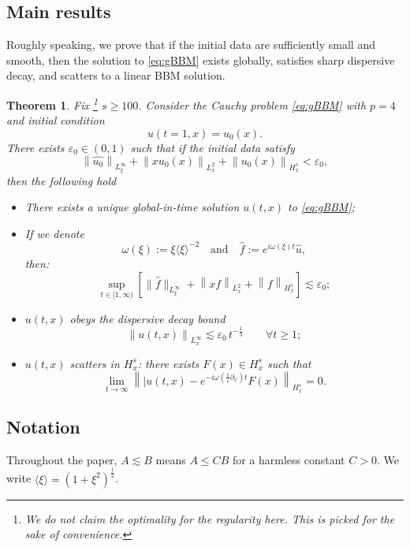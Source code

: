\documentclass[reqno,english,11pt]{amsart}
\newcommand{\eps}{\varepsilon}
\newcommand{\snorm}[1]{\left\|#1\right\|}
\newtheorem{theorem}{Theorem}[section]
\theoremstyle{definition}
\numberwithin{equation}{section}
\begin{document}
\subsection{Main results}
Roughly speaking, we prove that if the initial data are sufficiently small and smooth, then the solution to \eqref{eq:gBBM} exists globally, satisfies sharp dispersive decay, and scatters to a linear BBM solution.
\begin{theorem}\label{thm:main}
Fix \footnote{We do not claim the optimality for the regularity here. This is picked for the sake of convenience.} $s \ge 100$. Consider the Cauchy problem \eqref{eq:gBBM} with $p = 4$ and initial condition 
\begin{equation}
u(t=1,x) = u_0(x).
\end{equation}
There exists $\eps_0 \in (0,1)$ such that if the initial data satisfy
$$\snorm{\widehat{u_0}}_{L^\infty_\xi}+\snorm{xu_0(x)}_{L^2_x}+\snorm{u_0(x)}_{H^s_x}<\eps_0,$$
then the following hold
\begin{itemize}
\item There exists a unique global-in-time solution $u(t,x)$ to \eqref{eq:gBBM};

\item If we denote
$$\omega(\xi) := \xi \langle \xi \rangle^{-2}\quad \text{and} \quad\widehat{f} := e^{i\omega(\xi)t}\widehat{u},$$
then:%
$$\sup_{t \in [1,\infty)}\left[\|\widehat{f}\|_{L^\infty_\xi}+ \snorm{x f}_{L^2_x}+ \snorm{f}_{H^s_x}\right]\lesssim \eps_0;$$

\item $u(t,x)$ obeys the dispersive decay bound
$$\snorm{u(t,x)}_{L^\infty_x}\lesssim \eps_0\, t^{-\frac{1}{3}}\qquad \forall t \geq 1;$$

\item $u(t,x)$ scatters in $H^s_x$: there exists $F(x) \in H^s_x$ such that
$$\lim_{t \to \infty}\snorm{|u(t,x) - e^{-i\omega\left(\frac{1}{i}\partial_x\right)t}F(x)}_{H^s_x}= 0.$$
\end{itemize}
\end{theorem}






\subsection{Notation}
Throughout the paper, $A\lesssim B$ means $A\le C B$ for a harmless constant $C>0$.
We write $\langle\xi\rangle=(1+\xi^2)^{\frac{1}{2}}$.
\end{document}
